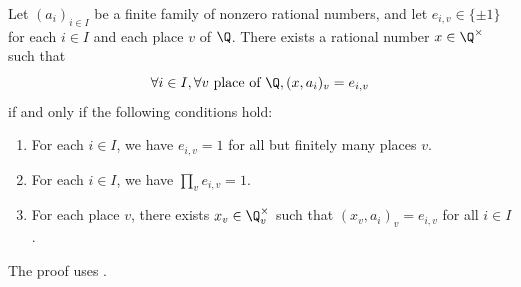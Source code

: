 \begin{theorem}\label{thm:existence}
	\leanok
	Let $(a_i)_{i \in I}$ be a finite family of nonzero rational numbers, and let
	$e_{i,v} \in \{\pm 1\}$ for each $i \in I$ and each place $v$ of $\Q$. There exists a rational
	number $x \in \Q^\times$ such that
	\[
	\forall i \in I, \forall v \text{ place of } \Q, (x,a_i)_v=e_{i,v}
	\]
	if and only if the following conditions hold:
	\begin{enumerate}
		\item For each $i \in I$, we have $e_{i,v}=1$ for all but finitely many places $v$.
		\item For each $i \in I$, we have $\prod_v e_{i,v}=1$.
		\item For each place $v$, there exists $x_v \in \Q_v^\times$ such that
		$(x_v, a_i)_v = e_{i,v}$ for all $i \in I$.
	\end{enumerate}
\end{theorem}

The proof uses .

